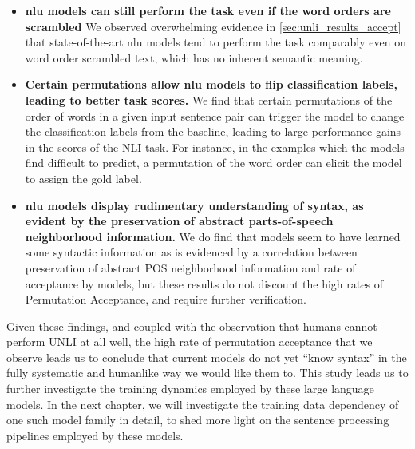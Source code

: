 \documentclass[letterpaper, 12pt]{report}
\newcommand{\PermAcc}{Permutation Acceptance} %
\begin{document}
\begin{itemize}
  \item \textbf{\acrshort{nlu} models can still perform the task even if the word orders are scrambled} We observed overwhelming evidence in \autoref{sec:unli_results_accept} that state-of-the-art \acrshort{nlu} models tend to perform the task comparably even on word order scrambled text, which has no inherent semantic meaning.

  \item \textbf{Certain permutations allow \acrshort{nlu} models to flip classification labels, leading to better task scores.} We find that certain permutations of the order of words in a given input sentence pair can trigger the model to change the classification labels from the baseline, leading to large performance gains in the scores of the NLI task. For instance, in the examples which the models find difficult to predict, a permutation of the word order can elicit the model to assign the gold label.

  \item \textbf{\acrshort{nlu} models display rudimentary understanding of syntax, as evident by the preservation of abstract parts-of-speech neighborhood information.} We do find that models seem to have learned some syntactic information as is evidenced by a correlation between preservation of abstract POS neighborhood information and rate of acceptance by models, but these results do not discount the high rates of \PermAcc, and require further verification.

\end{itemize}


Given these findings, and coupled with the observation that humans cannot perform UNLI at all well, the high rate of permutation acceptance that we observe leads us to conclude that current models do not yet ``know syntax'' in the fully systematic and humanlike way we would like them to. This study leads us to further investigate the training dynamics employed by these large language models. In the next chapter, we will investigate the training data dependency of one such model family in detail, to shed more light on the sentence processing pipelines employed by these models.
\end{document}
